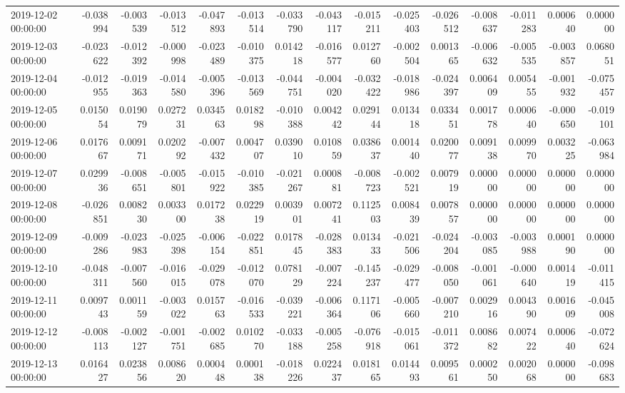 \begin{tabular}{lrrrrrrrrrrrrrr}
2019-12-02 00:00:00 & -0.038994 & -0.003539 & -0.013512 & -0.047893 & -0.013514 & -0.033790 & -0.043117 & -0.015211 & -0.025403 & -0.026512 & -0.008637 & -0.011283 & 0.000640 & 0.000000 \\
2019-12-03 00:00:00 & -0.023622 & -0.012392 & -0.000998 & -0.023489 & -0.010375 & 0.014218 & -0.016577 & 0.012760 & -0.002504 & 0.001365 & -0.006632 & -0.005535 & -0.003857 & 0.068051 \\
2019-12-04 00:00:00 & -0.012955 & -0.019363 & -0.014580 & -0.005396 & -0.013569 & -0.044751 & -0.004020 & -0.032422 & -0.018986 & -0.024397 & 0.006409 & 0.005455 & -0.001932 & -0.075457 \\
2019-12-05 00:00:00 & 0.015054 & 0.019079 & 0.027231 & 0.034563 & 0.018298 & -0.010388 & 0.004242 & 0.029144 & 0.013418 & 0.033451 & 0.001778 & 0.000640 & -0.000650 & -0.019101 \\
2019-12-06 00:00:00 & 0.017667 & 0.009171 & 0.020292 & -0.007432 & 0.004707 & 0.039010 & 0.010859 & 0.038637 & 0.001440 & 0.020077 & 0.009138 & 0.009970 & 0.003225 & -0.063984 \\
2019-12-07 00:00:00 & 0.029936 & -0.008651 & -0.005801 & -0.015922 & -0.010385 & -0.021267 & 0.000881 & -0.008723 & -0.002521 & 0.007919 & 0.000000 & 0.000000 & 0.000000 & 0.000000 \\
2019-12-08 00:00:00 & -0.026851 & 0.008230 & 0.003300 & 0.017238 & 0.022919 & 0.003901 & 0.007241 & 0.112503 & 0.008439 & 0.007857 & 0.000000 & 0.000000 & 0.000000 & 0.000000 \\
2019-12-09 00:00:00 & -0.009286 & -0.023983 & -0.025398 & -0.006154 & -0.022851 & 0.017845 & -0.028383 & 0.013433 & -0.021506 & -0.024204 & -0.003085 & -0.003988 & 0.000190 & 0.000000 \\
2019-12-10 00:00:00 & -0.048311 & -0.007560 & -0.016015 & -0.029078 & -0.012070 & 0.078129 & -0.007224 & -0.145237 & -0.029477 & -0.008050 & -0.001061 & -0.000640 & 0.001419 & -0.011415 \\
2019-12-11 00:00:00 & 0.009743 & 0.001159 & -0.003022 & 0.015763 & -0.016533 & -0.039221 & -0.006364 & 0.117106 & -0.005660 & -0.007210 & 0.002916 & 0.004390 & 0.001609 & -0.045008 \\
2019-12-12 00:00:00 & -0.008113 & -0.002127 & -0.001751 & -0.002685 & 0.010270 & -0.033188 & -0.005258 & -0.076918 & -0.015061 & -0.011372 & 0.008682 & 0.007422 & 0.000640 & -0.072624 \\
2019-12-13 00:00:00 & 0.016427 & 0.023856 & 0.008620 & 0.000448 & 0.000138 & -0.018226 & 0.022437 & 0.018165 & 0.014493 & 0.009561 & 0.000250 & 0.002068 & 0.000000 & -0.098683 \\

\end{tabular}
